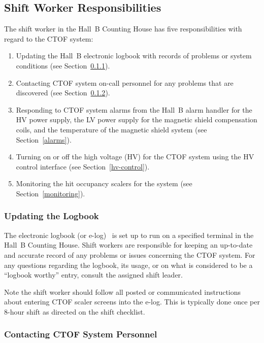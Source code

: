 \documentclass[12pt]{article}
\begin{document}
\subsection{Shift Worker Responsibilities}

The shift worker in the Hall~B Counting House has five responsibilities with regard to the CTOF
system:

\begin{enumerate}
\item Updating the Hall~B electronic logbook with records of problems or system conditions (see 
Section~\ref{logbook}).

\item Contacting CTOF system on-call personnel for any problems that are discovered (see 
Section~\ref{contact}).

\item Responding to CTOF system alarms from the Hall~B alarm handler for the HV power supply, the
LV power supply for the magnetic shield compensation coils, and the temperature of the magnetic
shield system (see Section~\ref{alarms}).

\item Turning on or off the high voltage (HV) for the CTOF system using the HV control interface 
(see Section~\ref{hv-control}).

\item Monitoring the hit occupancy scalers for the system (see Section~\ref{monitoring}).
\end{enumerate}

\subsubsection{Updating the Logbook}
\label{logbook}

The electronic logbook (or e-log)~\cite{e-log} is set up to run on a specified terminal in the 
Hall~B Counting House. Shift workers are responsible for keeping an up-to-date and accurate record
of any problems or issues concerning the CTOF system. For any questions regarding the logbook, its
usage, or on what is considered to be a ``logbook worthy'' entry, consult the assigned shift leader.

Note the shift worker should follow all posted or communicated instructions about entering CTOF
scaler screens into the e-log. This is typically done once per 8-hour shift as directed on the
shift checklist.

\subsubsection{Contacting CTOF System Personnel}
\label{contact}
\end{document}

